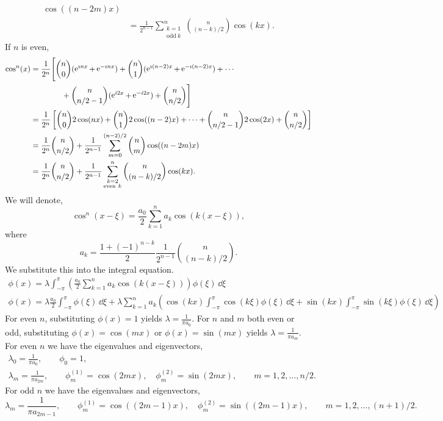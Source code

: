 \begin{Solution}
\begin{enumerate}
\begin{align*}
      \cos((n-2m)x) \\
      &= \frac{1}{2^{n-1}} \sum_{\substack{k = 1 \\ \mathrm{odd}\ k}}^n
      \binom{ n }{ (n-k)/2 } \cos(k x).
    \end{align*}
    If $n$ is even,
    \begin{align*}
      \cos^n(x)
      &= \frac{1}{2^n} \Bigg[ \binom{n}{0}(\mathop{\mathrm{e}}\nolimits^{\imath n x}+\mathop{\mathrm{e}}\nolimits^{-\imath n x})
      + \binom{n}{1} (\mathop{\mathrm{e}}\nolimits^{\imath (n-2)x}+\mathop{\mathrm{e}}\nolimits^{-\imath (n-2)x}) + \cdots \\
      &\qquad\qquad + \binom{n}{n/2-1} (\mathop{\mathrm{e}}\nolimits^{i2x}+\mathop{\mathrm{e}}\nolimits^{-i2x}) 
      + \binom{n}{n/2}\Bigg] \\
      &= \frac{1}{2^n} \left[ \binom{n}{0}2\cos(n x)
        + \binom{n}{1} 2\cos((n-2)x) + \cdots +
        \binom{n}{n/2-1} 2\cos(2x) + \binom{n}{n/2}\right] \\
      &= \frac{1}{2^n} \binom{n}{n/2} + \frac{1}{2^{n-1}} \sum_{m=0}^{(n-2)/2}
      \binom{n}{m} \cos((n-2m)x) \\
      &= \frac{1}{2^n} \binom{n}{n/2}
      + \frac{1}{2^{n-1}} \sum_{\substack{k = 2 \\ \mathrm{even}\ k}}^n
      \binom{ n }{ (n-k)/2 } \cos(k x).
    \end{align*}
    We will denote,
    \[
    \cos^n (x - \xi) = \frac{a_0}{2} \sum_{k = 1}^n a_k \cos(k (x - \xi) ),
    \]
    where
    \[
    a_k = \frac{ 1 + (-1)^{n-k} }{2} \frac{1}{2^{n-1}} \binom{ n }{ (n-k)/2 }.
    \]
    We substitute this into the integral equation.
    \begin{gather*}
      \phi(x) = \lambda \int_{-\pi}^\pi  
      \left( \frac{a_0}{2} \sum_{k = 1}^n a_k \cos(k (x - \xi) ) \right)
      \phi(\xi) \,\dd \xi \\
      \phi(x) = \lambda \frac{a_0}{2} \int_{-\pi}^\pi \phi(\xi) \,\dd \xi + 
      \lambda \sum_{k = 1}^n a_k \left( 
        \cos(k x) \int_{-\pi}^\pi \cos(k \xi) \phi(\xi) \,\dd \xi
        + \sin(k x) \int_{-\pi}^\pi \sin(k \xi) \phi(\xi) \,\dd \xi \right)
    \end{gather*}
    For even $n$, substituting $\phi(x) = 1$ yields $\lambda = \frac{1}{\pi a_0}$.
    For $n$ and $m$ both even or odd, substituting $\phi(x) = \cos(m x)$ or 
    $\phi(x) = \sin(m x)$ yields $\lambda = \frac{1}{\pi a_m}$.  
    For even $n$ we have the eigenvalues and eigenvectors,
    \begin{gather*}
      \lambda_0 = \frac{1}{\pi a_0}, \qquad \phi_0 = 1, \\
      \lambda_m = \frac{1}{\pi a_{2m}}, \qquad \phi^{(1)}_m = \cos(2 m x),
      \quad \phi^{(2)}_m = \sin(2 m x), \qquad m = 1, 2, \ldots, n/2.
    \end{gather*}
    For odd $n$ we have the eigenvalues and eigenvectors,
    \[
    \lambda_m = \frac{1}{\pi a_{2m-1}}, \qquad \phi^{(1)}_m = \cos((2 m - 1) x),
    \quad \phi^{(2)}_m = \sin((2 m - 1) x), \qquad m = 1, 2, \ldots, (n+1)/2.
    \]
  \end{enumerate}
\end{Solution}



